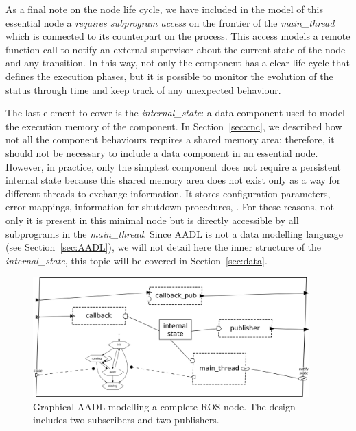 As a final note on the node life cycle, we have included in the model of this essential node a \textit{requires subprogram access} on the frontier of the \textit{main\_thread} which is connected to its counterpart on the process. This access models a remote function call to notify an external supervisor about the current state of the node and any transition. In this way, not only the component has a clear life cycle that defines the execution phases, but it is possible to monitor the evolution of the status through time and keep track of any unexpected behaviour.

The last element to cover is the \textit{internal\_state}: a data component used to model the execution memory of the component. In Section~\ref{sec:cnc}, we described how not all the component behaviours requires a shared memory area; therefore, it should not be necessary to include a data component in an essential node. However, in practice, only the simplest component does not require a persistent internal state because this shared memory area does not exist only as a way for different threads to exchange information. It stores configuration parameters, error mappings, information for shutdown procedures, \etc. For these reasons, not only it is present in this minimal node but is directly accessible by all subprograms in the \textit{main\_thread}. Since AADL is not a data modelling language (see Section~\ref{sec:AADL}), we will not detail here the inner structure of the \textit{internal\_state}, this topic will be covered in Section~\ref{sec:data}.

\begin{figure}[t]
    \centering
    \includegraphics[width=0.95\textwidth]{gfx/sample_node}
    \caption[Graphical AADL modelling a complete ROS node.]{Graphical AADL modelling a complete ROS node. The design includes two subscribers and two publishers.}\label{fig:sample-node}
\end{figure}

